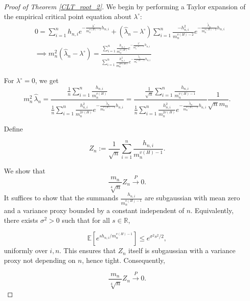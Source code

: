 \documentclass[12pt]{article}
\numberwithin{equation}{section}
\begin{document}
\begin{proof}[Proof of Theorem \ref{CLT_root_2}]
We begin by performing a Taylor expansion of the empirical critical point equation about $\lambda^{\circ}$:
\begin{align*}
&0 = \sum\limits_{i=1}^{n} h_{n,i} e^{-\frac{\lambda^{\circ}}{m_n^{v(H)-2}}h_{n,i}} + (\hat{\lambda}_n - \lambda^{\circ})\sum\limits_{i=1}^{n} \frac{-h_{n,i}^2}{m_n^{v(H)-2}}e^{-\frac{\tilde{\lambda}_n}{m_n^{v(H)-2}}h_{n,i}} \\
&\implies m_n^2(\hat{\lambda}_n - \lambda^{\circ}) = \frac{\sum\limits_{i=1}^{n}\frac{h_{n,i}}{m_n^{v(H)}}e^{-\frac{\lambda^{\circ}}{m_n^{v(H)-2}}h_{n,i}}}{\sum\limits_{i=1}^{n}\frac{h_{n,i}^2}{m_n^{2v(H)}}e^{-\frac{\tilde{\lambda}_n}{m_n^{v(H)-2}}h_{n,i}} }
\end{align*}

For $\lambda^{\circ}=0$, we get
\begin{equation}
m_n^2 \,\hat{\lambda}_n
=
\frac{\frac{1}{n}\displaystyle \sum_{i=1}^{n} \frac{h_{n,i}}{m_n^{v(H)}}}
     {\frac{1}{n}\displaystyle \sum\limits_{i=1}^{n}\frac{h_{n,i}^2}{m_n^{2v(H)}}e^{-\frac{\tilde{\lambda}_n}{m_n^{v(H)-2}}h_{n,i}} }=\frac{\frac{1}{\sqrt{n}}\displaystyle \sum_{i=1}^{n} \frac{h_{n,i}}{m_n^{v(H)-1}}}{\frac1n\displaystyle \sum\limits_{i=1}^{n}\frac{h_{n,i}^2}{m_n^{2v(H)}}e^{-\frac{\tilde{\lambda}_n}{m_n^{v(H)-2}}h_{n,i}}}\frac{1}{\sqrt{n}{m_n}}.\label{lambda_0_asymp}
\end{equation}

Define


\[
    Z_n := \frac{1}{\sqrt{n}} \sum_{i=1}^{n} \frac{h_{n,i}}{m_n^{v(H)-1}} .
\]


We show that
\begin{equation}
    \frac{m_n}{\sqrt[4]{n}} Z_n \xrightarrow{P} 0 .
    \label{num_conv_1}
\end{equation}
It suffices to show that the summands 
\(\tfrac{h_{n,i}}{m_n^{v(H)-1}}\) are subgaussian with mean zero and a variance proxy bounded by a constant independent of \(n\).  
Equivalently, there exists \(\sigma^2>0\) such that for all \(s\in\mathbb{R}\),


\[
    \mathbb{E}\!\left[e^{s h_{n,i}/m_n^{v(H)-1}}\right] \leq e^{\sigma^2 s^2/2},
\]
uniformly over \(i,n\).  
This ensures that \(Z_n\) itself is subgaussian with a variance proxy not depending on \(n\), hence tight.  
Consequently,


\[
    \frac{m_n}{\sqrt[4]{n}} Z_n \xrightarrow{P} 0.
\]





\end{proof}
\end{document}
